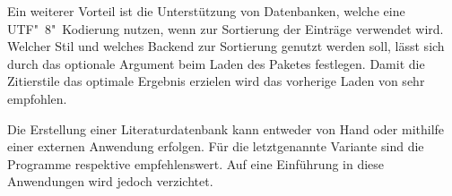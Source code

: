\documentclass[%
  english,ngerman,%
  cdgeometry=no,DIV=12,automark,%
]{tudscrartcl}
\begin{document}
Ein weiterer Vorteil ist die Unterstützung von Datenbanken, welche eine 
UTF"~8"~Kodierung nutzen, wenn  zur Sortierung der Einträge 
verwendet wird. Welcher Stil und welches Backend zur Sortierung genutzt werden 
soll, lässt sich durch das optionale Argument beim Laden des Paketes festlegen. 
Damit die Zitierstile das optimale Ergebnis erzielen wird das vorherige Laden 
von  sehr empfohlen.
%
\begin{Preamble}
\usepackage{csquotes}
\usepackage[backend=biber,style=alphabetic]{biblatex}

\end{Preamble}
%
Die Erstellung einer Literaturdatenbank kann entweder von Hand oder mithilfe 
einer externen Anwendung erfolgen. Für die letztgenannte Variante sind die 
Programme  respektive  empfehlenswert. 
Auf eine Einführung in diese Anwendungen wird jedoch verzichtet. 
\end{document}
